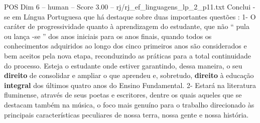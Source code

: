 \begin{textsample}{POS Dim 6 – human – Score 3.00 – rj/rj\_ef\_linguagens\_lp\_2\_p11.txt}  \label{ex:f6_pos_011}
Conclui -se em Língua Portuguesa que há destaque sobre duas importantes questões : 1- O caráter de progressividade quanto à aprendizagem do estudante, que não “ pula ou lança -se ” dos anos iniciais para os anos finais, quando todos os conhecimentos adquiridos ao longo dos cinco primeiros anos são considerados e bem aceitos pela nova etapa, reconduzindo as práticas para a total continuidade do processo.
Esteja o estudante onde estiver garantindo, dessa maneira, o seu \textbf{direito} de consolidar e ampliar o que aprendeu e, sobretudo, \textbf{direito} à educação \textbf{integral} dos últimos quatro anos do Ensino Fundamental. 2- Estará na literatura fluminense, através de seus poetas e escritores, dentre os quais aqueles que se destacam também na música, o foco mais genuíno para o trabalho direcionado às principais características peculiares de nossa terra, nossa gente e nossa história.

\end{textsample}
